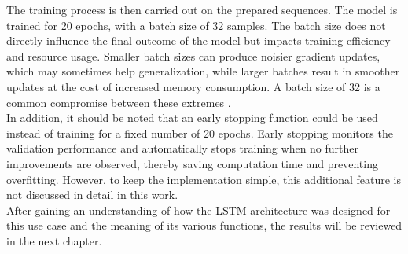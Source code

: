 The training process is then carried out on the prepared sequences. The model is trained for 20 epochs, with a batch size of 32 samples. The batch size does not directly influence the final outcome of the model but impacts training efficiency and resource usage. Smaller batch sizes can produce noisier gradient updates, which may sometimes help generalization, while larger batches result in smoother updates at the cost of increased memory consumption. A batch size of 32 is a common compromise between these extremes \cite{batch_size_lstm}.\\

In addition, it should be noted that an early stopping function could be used instead of training for a fixed number of 20 epochs. Early stopping monitors the validation performance and automatically stops training when no further improvements are observed, thereby saving computation time and preventing overfitting. However, to keep the implementation simple, this additional feature is not discussed in detail in this work.\\

After gaining an understanding of how the LSTM architecture was designed for this use case and the meaning of its various functions, the results will be reviewed in the next chapter.
